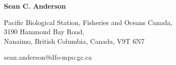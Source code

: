 \documentclass[10pt]{article}
\title{}
\author{}
\date{}
\begin{document}
\begin{spacing}{1}
\thispagestyle{empty}

{\LARGE \textbf{Sean C. Anderson}}\\
\vspace{-1.0mm}

Pacific Biological Station,
Fisheries and Oceans Canada,\\
3190 Hammond Bay Road,\\
Nanaimo, British Columbia, Canada,
V9T 6N7

sean.anderson@dfo-mpo.gc.ca\\

\vspace{-4.5mm}



\end{spacing}
\end{document}
